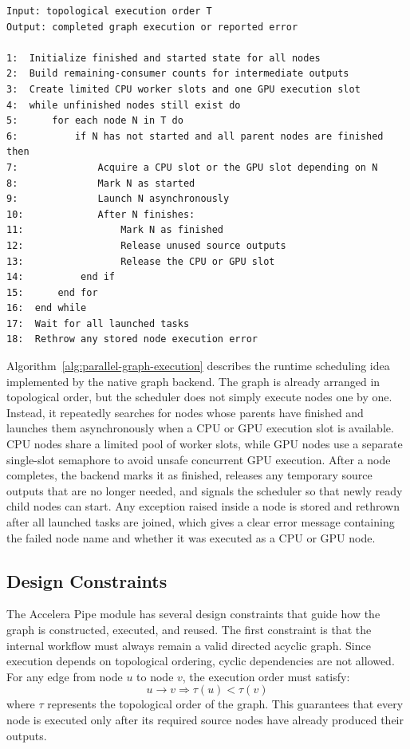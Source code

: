 \newpage
\begin{lstlisting}[style=algostyle,caption={Parallel graph execution scheduling},label={alg:parallel-graph-execution}]
Input: topological execution order T
Output: completed graph execution or reported error

1:  Initialize finished and started state for all nodes
2:  Build remaining-consumer counts for intermediate outputs
3:  Create limited CPU worker slots and one GPU execution slot
4:  while unfinished nodes still exist do
5:      for each node N in T do
6:          if N has not started and all parent nodes are finished then
7:              Acquire a CPU slot or the GPU slot depending on N
8:              Mark N as started
9:              Launch N asynchronously
10:             After N finishes:
11:                 Mark N as finished
12:                 Release unused source outputs
13:                 Release the CPU or GPU slot
14:          end if
15:      end for
16:  end while
17:  Wait for all launched tasks
18:  Rethrow any stored node execution error
\end{lstlisting}

Algorithm~\ref{alg:parallel-graph-execution} describes the runtime scheduling idea
implemented by the native graph backend. The graph is already arranged in
topological order, but the scheduler does not simply execute nodes one by one.
Instead, it repeatedly searches for nodes whose parents have finished and launches
them asynchronously when a CPU or GPU execution slot is available. CPU nodes share
a limited pool of worker slots, while GPU nodes use a separate single-slot semaphore
to avoid unsafe concurrent GPU execution. After a node completes, the backend marks
it as finished, releases any temporary source outputs that are no longer needed, and
signals the scheduler so that newly ready child nodes can start. Any exception raised
inside a node is stored and rethrown after all launched tasks are joined, which gives a
clear error message containing the failed node name and whether it was executed as a
CPU or GPU node.


\subsection{Design Constraints}

The Accelera Pipe module has several design constraints that guide how the graph
is constructed, executed, and reused. The first constraint is that the internal
workflow must always remain a valid directed acyclic graph. Since execution
depends on topological ordering, cyclic dependencies are not allowed. For any
edge from node \(u\) to node \(v\), the execution order must satisfy:
\[
u \rightarrow v \Rightarrow \tau(u) < \tau(v)
\]
where \(\tau\) represents the topological order of the graph. This guarantees
that every node is executed only after its required source nodes have already
produced their outputs.

